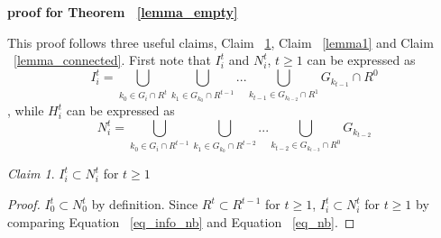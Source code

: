\documentclass[12pt,letterpaper]{article}
\theoremstyle{definition}
\theoremstyle{remark}
\theoremstyle{claim}
\newtheorem{claim}{Claim}
\begin{document}
\bigskip
\noindent\textbf{proof for Theorem ~\ref{lemma_empty}}

This proof follows three useful claims, Claim ~\ref{lemma_I_subset_N}, Claim ~\ref{lemma1} and Claim ~\ref{lemma_connected}. First note that $I^t_i$ and $N^t_i$, $t\geq 1$ can be expressed as 
\begin{equation}
\label{eq_info_nb}
I^{t}_i = \bigcup_{k_0\in G_i\cap R^{t}}\bigcup_{k_1\in G_{k_0}\cap R^{t-1}}...\bigcup_{k_{t-1}\in G_{k_{t-2}}\cap R^{1}}G_{k_{t-1}}\cap R^0
\end{equation}
, while $H^t_i$ can be expressed as
\begin{equation}
\label{eq_nb}
N^t_i = \bigcup_{k_0\in G_i\cap R^{t-1}}\bigcup_{k_1\in G_{k_0}\cap R^{t-2}}...\bigcup_{k_{t-2}\in G_{k_{t-3}}\cap R^{0}}G_{k_{t-2}}
\end{equation}

\begin{claim}
\label{lemma_I_subset_N}
$I^t_i\subset N^t_i$ for $t\geq 1$
\end{claim}
\begin{proof}
$I^t_0\subset N^t_0$ by definition. Since $R^t\subset R^{t-1}$ for $t\geq 1$, $I^t_i\subset N^t_i$ for $t\geq 1$ by comparing Equation ~\ref{eq_info_nb} and Equation ~\ref{eq_nb}.
\end{proof}
\end{document}
